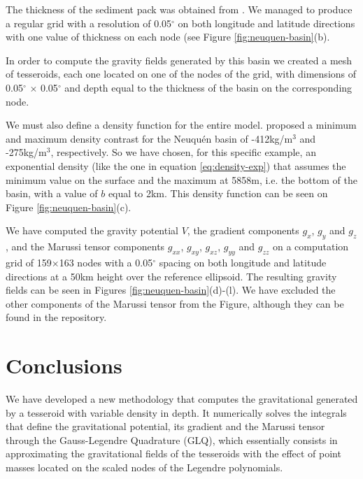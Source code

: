 \documentclass[extra]{gji}
\begin{document}
The thickness of the sediment pack was obtained from \citet{Heine2007}.
We managed to produce a regular grid with a resolution of 0.05$^\circ$ on both 
longitude and latitude directions with one value of thickness on each node 
(see Figure \ref{fig:neuquen-basin}(b).

In order to compute the gravity fields generated by this basin we created a 
mesh of tesseroids, each one located on one of the nodes of the grid, with 
dimensions of 0.05$^\circ$ $\times$ 0.05$^\circ$ and depth equal to the 
thickness of the basin on the corresponding node.

We must also define a density function for the entire model.
\citet{Sigismondi2012} proposed a minimum and maximum density contrast for the 
Neuqu\'en basin of -412kg/m$^3$ and -275kg/m$^3$, respectively.
So we have chosen, for this specific example, an exponential density (like the 
one in equation \ref{eq:density-exp}) that assumes the minimum value on the 
surface and the maximum at 5858m, i.e. the bottom of the basin, with a value 
of $b$ equal to 2km.
This density function can be seen on Figure \ref{fig:neuquen-basin}(c).

We have computed the gravity potential $V$, the gradient components $g_x$, 
$g_y$ and $g_z$, and the Marussi tensor components $g_{xx}$, $g_{xy}$, 
$g_{xz}$, $g_{yy}$  and $g_{zz}$ on a computation grid of 159$\times$163 nodes 
with a 0.05$^\circ$ spacing on both longitude and latitude directions at a 
50km height over the reference ellipsoid.
The resulting gravity fields can be seen in Figures 
\ref{fig:neuquen-basin}(d)-(l).
We have excluded the other components of the Marussi tensor from the Figure, 
although they can be found in the repository.



\section{Conclusions}

We have developed a new methodology that computes the gravitational generated 
by a tesseroid with variable density in depth.
It numerically solves the integrals that define the gravitational potential, 
its gradient and the Marussi tensor through the Gauss-Legendre Quadrature 
(GLQ), which essentially consists in approximating the gravitational fields of 
the tesseroids with the effect of point masses located on the scaled nodes of 
the Legendre polynomials.
\end{document}
